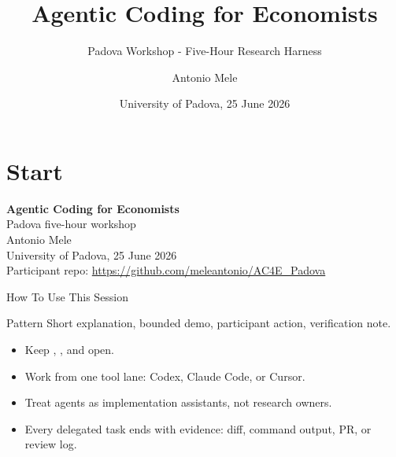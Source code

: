 


\renewcommand{\WorkshopRepoUrl}{\url{https://github.com/meleantonio/AC4E_Padova}}
\renewcommand{\ParentCourseUrl}{\url{https://github.com/meleantonio/AC4E_Pavia}}
\title{Agentic Coding for Economists}
\subtitle{Padova Workshop - Five-Hour Research Harness}
\author{Antonio Mele}
\date{University of Padova, 25 June 2026}

\newcommand{\demo}[1]{\textcolor{courseteal}{\textbf{Demo: #1}}}
\newcommand{\handoff}[1]{\textcolor{courseblue}{\textbf{Handoff: #1}}}



\section{Start}

\begin{frame}{}
  \begin{center}
    {\LARGE \textbf{Agentic Coding for Economists}} \\
    \vspace{0.4em}
    {\large Padova five-hour workshop} \\
    \vspace{0.6em}
    Antonio Mele \\
    \vspace{0.4em}
    {\small University of Padova, 25 June 2026} \\
    \vspace{0.8em}
    {\footnotesize Participant repo: \WorkshopRepoUrl}
  \end{center}
\end{frame}

\begin{frame}{How To Use This Session}
  \begin{block}{Pattern}
    Short explanation, bounded demo, participant action, verification note.
  \end{block}
  \begin{itemize}
    \item Keep , , and  open.
    \item Work from one tool lane: Codex, Claude Code, or Cursor.
    \item Treat agents as implementation assistants, not research owners.
    \item Every delegated task ends with evidence: diff, command output, PR, or review log.
  \end{itemize}
\end{frame}

